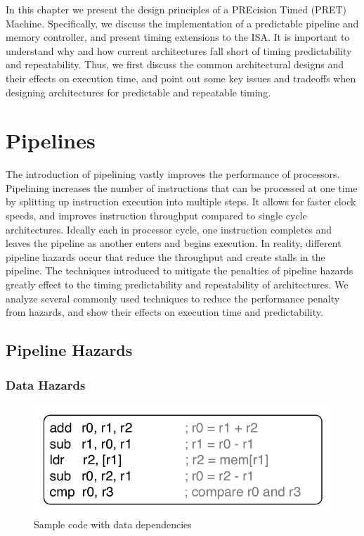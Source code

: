 In this chapter we present the design principles of a PREcision Timed (PRET) Machine.
Specifically, we discuss the implementation of a predictable pipeline and memory controller, and present timing extensions to the ISA. 
It is important to understand why and how current architectures fall short of timing predictability and repeatability.
Thus, we first discuss the common architectural designs and their effects on execution time, and point out some key issues and tradeoffs when designing architectures for predictable and repeatable timing.

\section{Pipelines}
The introduction of pipelining vastly improves the performance of processors.
Pipelining increases the number of instructions that can be processed at one time by splitting up instruction execution into multiple steps.
It allows for faster clock speeds, and improves instruction throughput compared to single cycle architectures.
Ideally each in processor cycle, one instruction completes and leaves the pipeline as another enters and begins execution. 
In reality, different pipeline hazards occur that reduce the throughput and create stalls in the pipeline.
The techniques introduced to mitigate the penalties of pipeline hazards greatly effect to the timing predictability and repeatability of architectures.     
We analyze several commonly used techniques to reduce the performance penalty from hazards, and show their effects on execution time and predictability. 

\subsection{Pipeline Hazards}
\label{sec:pipeline_hazards}
\subsubsection{Data Hazards}

\begin{figure}
  \vspace{-30pt}
  \begin{center}
    \includegraphics[scale=.65]{figs/sample_data_dependent_code}
  \end{center}
  \vspace{-3mm}
  \caption{Sample code with data dependencies}
  \label{fig:sample_data_dependent_code}
\end{figure}

